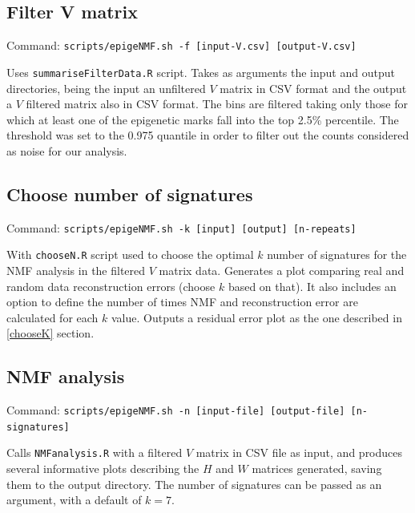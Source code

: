 \subsection{Filter V matrix}

Command: \texttt{scripts/epigeNMF.sh -f [input-V.csv] [output-V.csv]}

\smallskip

Uses \texttt{summariseFilterData.R} script. Takes as arguments the input and output directories, being the input an unfiltered \(V\) matrix in CSV format and the output a \(V\) filtered matrix also in CSV format. The bins are filtered taking only those for which at least one of the epigenetic marks fall into the top 2.5\% percentile. The threshold was set to the 0.975 quantile in order to filter out the counts considered as noise for our analysis.

\subsection{Choose number of signatures}

Command: \texttt{scripts/epigeNMF.sh -k [input] [output] [n-repeats]}

\smallskip

With \texttt{chooseN.R} script used to choose the optimal \(k\) number of signatures for the NMF analysis in the filtered \(V\) matrix data. Generates a plot comparing real and random data reconstruction errors (choose \(k\) based on that). It also includes an option to define the number of times NMF and reconstruction error are calculated for each \(k\) value. Outputs a residual error plot as the one described in \ref{chooseK} section.

\subsection{NMF analysis}

Command: \texttt{scripts/epigeNMF.sh -n [input-file] [output-file] [n-signatures]}

\smallskip

Calls \texttt{NMFanalysis.R} with a filtered \(V\) matrix in CSV file as input, and produces several informative plots describing the \(H\) and \(W\) matrices generated, saving them to the output directory. The number of signatures can be passed as an argument, with a default of \(k = 7\).


